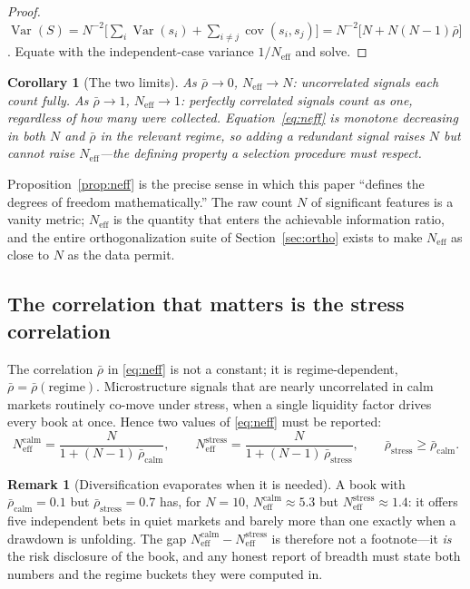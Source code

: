 \documentclass[11pt,a4paper]{article}
\theoremstyle{definition}
\newtheorem{remark}{Remark}[section]
\theoremstyle{plain}
\newtheorem{corollary}{Corollary}[section]
\newcommand{\cov}{\operatorname{cov}}
\newcommand{\Var}{\operatorname{Var}}
\newcommand{\Neff}{N_{\mathrm{eff}}}
\newcommand{\rhobar}{\bar{\rho}}
\begin{document}
\begin{proof}
$\Var(S)=N^{-2}\big[\sum_i\Var(s_i)+\sum_{i\neq j}\cov(s_i,s_j)\big]
        =N^{-2}\big[N+N(N-1)\rhobar\big]$. Equate with the independent-case variance $1/\Neff$ and
solve.
\end{proof}

\begin{corollary}[The two limits]
As $\rhobar\to 0$, $\Neff\to N$: uncorrelated signals each count fully. As $\rhobar\to 1$,
$\Neff\to 1$: perfectly correlated signals count as one, regardless of how many were collected.
Equation~\eqref{eq:neff} is monotone decreasing in both $N$ and $\rhobar$ in the relevant regime, so
\emph{adding a redundant signal raises $N$ but cannot raise $\Neff$}---the defining property a
selection procedure must respect.
\end{corollary}

Proposition~\ref{prop:neff} is the precise sense in which this paper ``defines the degrees of
freedom mathematically.'' The raw count $N$ of significant features is a vanity metric; $\Neff$ is
the quantity that enters the achievable information ratio, and the entire orthogonalization suite of
Section~\ref{sec:ortho} exists to make $\Neff$ as close to $N$ as the data permit.

\subsection{The correlation that matters is the stress correlation}

The correlation $\rhobar$ in \eqref{eq:neff} is not a constant; it is regime-dependent,
$\rhobar=\rhobar(\text{regime})$. Microstructure signals that are nearly uncorrelated in calm
markets routinely co-move under stress, when a single liquidity factor drives every book at once.
Hence two values of \eqref{eq:neff} must be reported:
\[
   \Neff^{\text{calm}} = \frac{N}{1+(N-1)\,\rhobar_{\text{calm}}},
   \qquad
   \Neff^{\text{stress}} = \frac{N}{1+(N-1)\,\rhobar_{\text{stress}}},
   \qquad \rhobar_{\text{stress}} \ge \rhobar_{\text{calm}}.
\]

\begin{remark}[Diversification evaporates when it is needed]
A book with $\rhobar_{\text{calm}}=0.1$ but $\rhobar_{\text{stress}}=0.7$ has, for $N=10$,
$\Neff^{\text{calm}}\approx 5.3$ but $\Neff^{\text{stress}}\approx 1.4$: it offers five independent
bets in quiet markets and barely more than one exactly when a drawdown is unfolding. The gap
$\Neff^{\text{calm}}-\Neff^{\text{stress}}$ is therefore not a footnote---it \emph{is} the risk
disclosure of the book, and any honest report of breadth must state both numbers and the regime
buckets they were computed in.
\end{remark}
\end{document}
